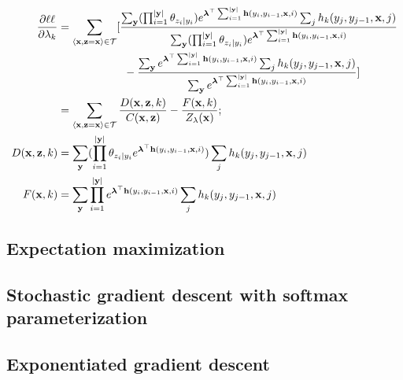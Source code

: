 \documentclass[11pt,onecolumn]{article}
\begin{document}
\begin{align}
  \frac{\partial \ell\ell}{\partial \lambda_k} &= \sum_{\langle\mathbf{x},\mathbf{z}=\mathbf{x}\rangle \in \cal{T}} 
  [
     \frac{\sum_{\mathbf{y}} (\prod_{i=1}^{|\mathbf{y}|} \theta_{z_i\mid y_i}) e^{\boldsymbol{\lambda}^\top \sum_{i=1}^{|\mathbf{y}|} \mathbf{h}(y_i, y_{i-1}, \mathbf{x}, i)} \sum_{j} h_k(y_j, y_{j-1}, \mathbf{x}, j) } 
          {\sum_{\mathbf{y}} (\prod_{i=1}^{|\mathbf{y}|} \theta_{z_i\mid y_i}) e^{\boldsymbol{\lambda}^\top \sum_{i=1}^{|\mathbf{y}|} \mathbf{h}(y_i, y_{i-1}, \mathbf{x}, i)} } \nonumber \\
     &\qquad \qquad \qquad - \frac{\sum_{\mathbf{y}} e^{\boldsymbol{\lambda}^\top \sum_{i=1}^{|\mathbf{y}|} \mathbf{h}(y_i, y_{i-1}, \mathbf{x}, i)} \sum_{j} h_k(y_j, y_{j-1}, \mathbf{x}, j)}
          {\sum_{\mathbf{y}} e^{\boldsymbol{\lambda}^\top \sum_{i=1}^{|\mathbf{y}|} \mathbf{h}(y_i, y_{i-1}, \mathbf{x}, i)} }
  ] \\
  &= \sum_{\langle\mathbf{x},\mathbf{z}=\mathbf{x}\rangle \in \cal{T}}
    \frac{D(\mathbf{x}, \mathbf{z}, k)}{C(\mathbf{x}, \mathbf{z})} - \frac{F(\mathbf{x}, k)}{Z_\lambda(\mathbf{x})}; \\
  D(\mathbf{x}, \mathbf{z}, k) &= \sum_{\mathbf{y}} (\prod_{i=1}^{|\mathbf{y}|} \theta_{z_i\mid y_i} e^{\boldsymbol{\lambda}^\top \mathbf{h}(y_i, y_{i-1}, \mathbf{x}, i)}) \sum_{j} h_k(y_j, y_{j-1}, \mathbf{x}, j) \\
  F(\mathbf{x}, k) &= \sum_{\mathbf{y}} \prod_{i=1}^{|\mathbf{y}|} e^{\boldsymbol{\lambda}^\top \mathbf{h}(y_i, y_{i-1}, \mathbf{x}, i)} \sum_{j} h_k(y_j, y_{j-1}, \mathbf{x}, j)
\end{align} 



\subsection{Expectation maximization}


\subsection{Stochastic gradient descent with softmax parameterization}


\subsection{Exponentiated gradient descent}
\end{document}
